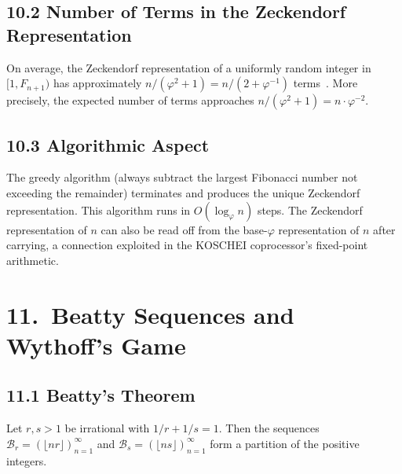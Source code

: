 \subsection{10.2 Number of Terms in the Zeckendorf Representation}
\label{subsec:gc-zeckendorf-count}

On average, the Zeckendorf representation of a
uniformly random integer in $[1, F_{n+1})$ has
approximately $n/(\varphi^2 + 1) = n/(2+\varphi^{-1})$
terms~\cite{koshy_fib_lucas}.
More precisely, the expected number of terms approaches
$n/(\varphi^2 + 1) = n \cdot \varphi^{-2}$.

\subsection{10.3 Algorithmic Aspect}
\label{subsec:gc-zeckendorf-algo}

The greedy algorithm (always subtract the largest
Fibonacci number not exceeding the remainder)
terminates and produces the unique Zeckendorf
representation.
This algorithm runs in $O(\log_\varphi n)$ steps.
The Zeckendorf representation of $n$ can also be
read off from the base-$\varphi$ representation of
$n$ after carrying, a connection exploited in the
KOSCHEI coprocessor's fixed-point arithmetic.

\section{11.\ Beatty Sequences and Wythoff's Game}
\label{sec:gc-beatty-wythoff}

\subsection{11.1 Beatty's Theorem}
\label{subsec:gc-beatty}

\begin{theorem}[Beatty, 1926]
\label{thm:gc-beatty}
Let $r, s > 1$ be irrational with $1/r + 1/s = 1$.
Then the sequences
$\mathcal{B}_r = (\lfloor n r \rfloor)_{n=1}^{\infty}$
and $\mathcal{B}_s = (\lfloor n s \rfloor)_{n=1}^{\infty}$
form a partition of the positive integers.
\end{theorem}

